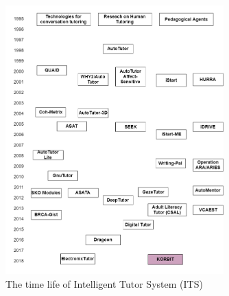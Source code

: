 \documentclass[letterpaper%
, twoside%
, 12pt%
,these%
, english%
,creativecommons,hyperref, withAlgo2e %
]{thETS}
\begin{document}
\begin{introduction}
\begin{figure}
	\includegraphics[width=0.75\textwidth]{Figures/ht1s.png}
	
	\caption{The time life of Intelligent Tutor System (ITS) }
	\label{fig:timeline}
\end{figure}


\end{introduction}
\end{document}
